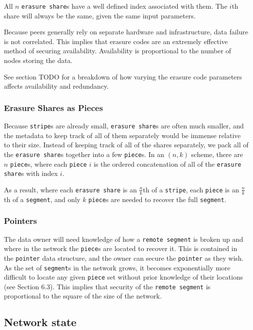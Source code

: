 \documentclass[a4paper,10pt]{article}
\newcommand{\x}[1]{{\tt #1}}
\newcommand{\todo}[1]{{\color{red} TODO #1}}
\begin{document}
All $n$ \x{erasure share}s have a well defined index associated with them. The
$i$th share will always be the same, given the same input parameters.

Because peers generally rely on separate hardware and infrastructure, data
failure is not correlated. This implies that erasure codes are an extremely
effective method of securing availability. Availability is proportional to the
number of nodes storing the data.

See section \todo{} for a breakdown of how varying the erasure code parameters
affects availability and redundancy.

\subsubsection{Erasure Shares as Pieces}

Because \x{stripe}s are already small, \x{erasure share}s are often
much smaller, and the metadata to keep track of all of them separately would be
immense relative to their size. Instead of keeping track of all of the shares
separately, we pack all of the \x{erasure share}s together into a few
\x{piece}s. In an $(n, k)$ scheme, there are $n$ \x{piece}s, where each
\x{piece} $i$ is the ordered concatenation of all of the \x{erasure share}s
with index $i$.

As a result, where each \x{erasure share} is an $\frac{n}{k}$th of a \x{stripe},
each \x{piece} is an $\frac{n}{k}$th of a \x{segment}, and only $k$ \x{piece}s
are needed to recover the full \x{segment}.

\subsubsection{Pointers}

The data owner will need knowledge of how a \x{remote segment} is broken up and
where in the network the \x{piece}s are located to recover it. This is contained
in the \x{pointer} data structure, and the owner can secure the \x{pointer} as
they wish. As the set of \x{segment}s in the network grows, it becomes
exponentially more difficult to locate any given \x{piece} set without prior
knowledge of their locations (see Section 6.3). This implies that security of
the \x{remote segment} is proportional to the square of the size of the network.

\subsection{Network state}
\end{document}
